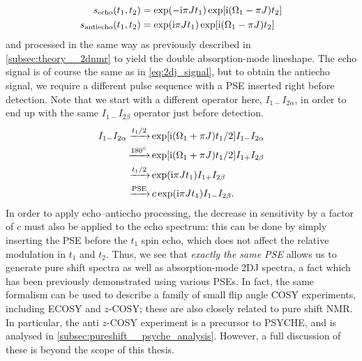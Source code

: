\begin{align}
    \label{eq:2dj_signal_ea}
    s_\text{echo}(t_1, t_2) &= \exp(-\mathrm{i}\pi J t_1) \exp[\mathrm{i}(\Omega_1 - \pi J) t_2] \\
    s_\text{antiecho}(t_1, t_2) &= \exp(\mathrm{i}\pi J t_1) \exp[\mathrm{i}(\Omega_1 - \pi J) t_2]
\end{align}
and processed in the same way as previously described in \cref{subsec:theory__2dnmr} to yield the double absorption-mode lineshape.
The echo signal is of course the same as in \cref{eq:2dj_signal}, but to obtain the antiecho signal, we require a different pulse sequence with a PSE inserted right before detection.
Note that we start with a different operator here, $I_{1-}I_{2\alpha}$, in order to end up with the same $I_{1-}I_{2\beta}$ operator just before detection.
\begin{align}
    \label{eq:2dj_signal_antiecho}
    I_{1-}I_{2\alpha} \xrightarrow[]{t_1/2} &\exp[\mathrm{i}(\Omega_1 + \pi J)t_1/2] I_{1-}I_{2\alpha} \\
    \xrightarrow[]{180^\circ} &\exp[\mathrm{i}(\Omega_1 + \pi J)t_1/2] I_{1+}I_{2\beta} \\
    \xrightarrow[]{t_1/2} &\exp(\mathrm{i} \pi J t_1) I_{1+}I_{2\beta} \\
    \xrightarrow[]{\text{PSE}} &\,c \exp(\mathrm{i} \pi J t_1) I_{1-}I_{2\beta}.
\end{align}
In order to apply echo--antiecho processing, the decrease in sensitivity by a factor of $c$ must also be applied to the echo spectrum: this can be done by simply inserting the PSE before the $t_1$ spin echo, which does not affect the relative modulation in $t_1$ and $t_2$.
Thus, we see that \textit{exactly the same PSE} allows us to generate pure shift spectra as well as absorption-mode 2DJ spectra, a fact which has been previously demonstrated using various PSEs.\autocite{Pell2007JMR,Foroozandeh2015CC}
In fact, the same formalism can be used to describe a family of small flip angle COSY experiments, including ECOSY\autocite{Griesinger1985JACS,Sorensen1985JACS,Griesinger1986JCP} and $z$-COSY\autocite{Oschkinat1986JMR,Pell2007MRC,Moutzouri2020ACIE}; these are also closely related to pure shift NMR.
In particular, the anti $z$-COSY experiment is a precursor to PSYCHE, and is analysed in \cref{subsec:pureshift__psyche_analysis}.
However, a full discussion of these is beyond the scope of this thesis.
